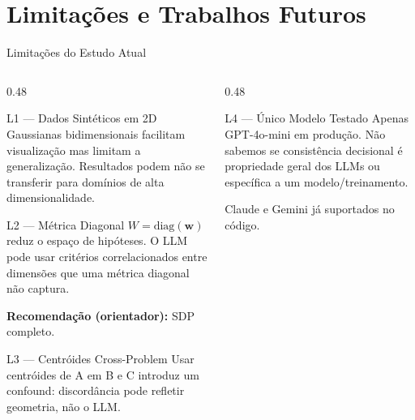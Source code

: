 \documentclass[aspectratio=169, 8pt]{beamer}
\begin{document}
\section{Limitações e Trabalhos Futuros}

\begin{frame}{Limitações do Estudo Atual}
  \begin{columns}[T]
    \begin{column}{0.48\textwidth}
      \begin{alertblock}{L1 --- Dados Sintéticos em 2D}
        \footnotesize
        Gaussianas bidimensionais facilitam visualização mas
        limitam a generalização. Resultados podem não se
        transferir para domínios de alta dimensionalidade.
      \end{alertblock}

      \vspace{0.1em}

      \begin{alertblock}{L2 --- Métrica Diagonal}
        \footnotesize
        $W = \mathrm{diag}(\mathbf{w})$ reduz o espaço de hipóteses.
        O LLM pode usar critérios correlacionados entre dimensões
        que uma métrica diagonal não captura.

        \vspace{0.2em}
        \textbf{Recomendação (orientador):} SDP completo.
      \end{alertblock}

      \vspace{0.1em}

      \begin{alertblock}{L3 --- Centróides Cross-Problem}
        \footnotesize
        Usar centróides de A em B e C introduz um confound:
        discordância pode refletir geometria, não o LLM.
      \end{alertblock}
    \end{column}

    \begin{column}{0.48\textwidth}
      \begin{alertblock}{L4 --- Único Modelo Testado}
        \footnotesize
        Apenas GPT-4o-mini em produção. Não sabemos se
        consistência decisional é propriedade geral dos LLMs
        ou específica a um modelo/treinamento.

        \vspace{0.2em}
        Claude e Gemini já suportados no código.
      \end{alertblock}


\end{column}
\end{columns}
\end{frame}
\end{document}
